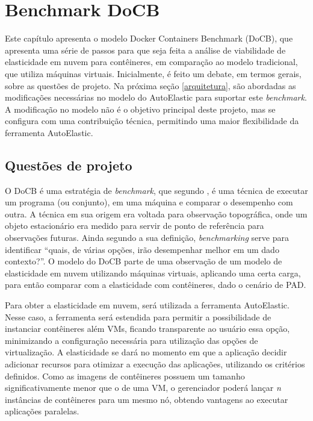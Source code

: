 \documentclass[twoside,english,brazilian]{UNISINOSartigo}
\begin{document}
\section{Benchmark DoCB}
\label{model}

Este capítulo apresenta o modelo Docker Containers Benchmark (DoCB), que apresenta uma série de passos para que seja feita a análise de viabilidade de elasticidade em nuvem para contêineres, em comparação ao modelo tradicional, que utiliza máquinas virtuais. Inicialmente, é feito um debate, em termos gerais, sobre as questões de projeto. Na próxima seção \ref{arquitetura}, são abordadas as modificações necessárias no modelo do AutoElastic para suportar este \textit{benchmark}. A modificação no modelo não é o objetivo principal deste projeto, mas se configura com uma contribuição técnica, permitindo uma maior flexibilidade da ferramenta AutoElastic. 

\subsection{Questões de projeto}
\label{questao}

O DoCB é uma estratégia de \textit{benchmark}, que segundo , é uma técnica de executar um programa (ou conjunto), em uma máquina e comparar o desempenho com outra. A técnica em sua origem era voltada para observação topográfica, onde um objeto estacionário era medido para servir de ponto de referência para observações futuras. Ainda segundo a sua definição, \textit{benchmarking} serve para identificar ``quais, de várias opções, irão desempenhar melhor em um dado contexto?''. O modelo do DoCB parte de uma observação de um modelo de elasticidade em nuvem utilizando máquinas virtuais, aplicando uma certa carga, para então comparar com a elasticidade com contêineres, dado o cenário de PAD.

Para obter a elasticidade em nuvem, será utilizada a ferramenta AutoElastic. Nesse caso, a ferramenta será estendida para permitir a possibilidade de instanciar contêineres além VMs, ficando transparente ao usuário essa opção, minimizando a configuração necessária para utilização das opções de virtualização. A elasticidade se dará no momento em que a aplicação decidir adicionar recursos para otimizar a execução das aplicações, utilizando os critérios definidos. Como as imagens de contêineres possuem um tamanho significativamente menor que o de uma VM, o gerenciador poderá lançar \textit{n} instâncias de contêineres para um mesmo nó, obtendo vantagens ao executar aplicações paralelas. 
\end{document}
